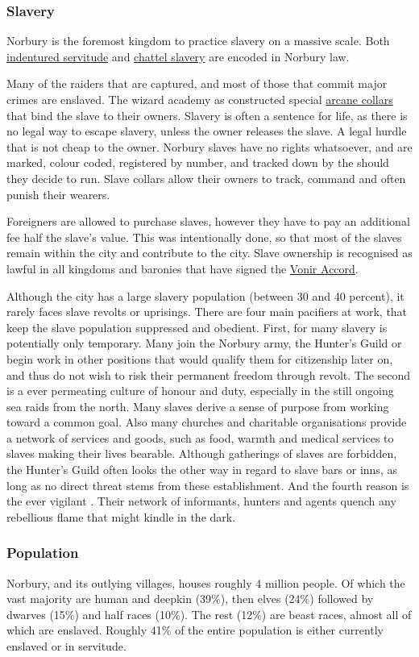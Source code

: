 \subsubsection{Slavery}
\label{sec:Slavery in Norbury}

Norbury is the foremost kingdom to practice slavery on a massive scale. Both
\hyperref[sec:Indentured Servitude]{indentured servitude} and
\hyperref[sec:Unregulated Slavery]{chattel slavery} are encoded in Norbury
law.

Many of the raiders that are captured, and most of those that commit major
crimes are enslaved. The wizard academy as constructed special
\hyperref[sec:Slave Band]{arcane collars} that bind the slave to their
owners. Slavery is often a sentence for life, as there is no legal way to
escape slavery, unless the owner releases the slave. A legal hurdle that is
not cheap to the owner. Norbury slaves have no rights whatsoever, and are
marked, colour coded, registered by number, and tracked down by the
 should they decide to run. Slave collars allow
their owners to track, command and often punish their wearers.

Foreigners are allowed to purchase slaves, however they have to pay an
additional fee half the slave's value. This was intentionally done, so that
most of the slaves remain within the city and contribute to the city. Slave
ownership is recognised as lawful in all kingdoms and baronies that have
signed the \hyperref[sec:Vonir Accord]{Vonir Accord}.

Although the city has a large slavery population (between 30 and 40 percent),
it rarely faces slave revolts or uprisings. There are four main pacifiers at
work, that keep the slave population suppressed and obedient. First, for many
slavery is potentially only temporary. Many join the Norbury army, the
Hunter's Guild or begin work in other positions that would qualify them for
citizenship later on, and thus do not wish to risk their permanent freedom
through revolt. The second is a ever permeating culture of honour and duty,
especially in the still ongoing sea raids from the north. Many slaves derive a
sense of purpose from working toward a common goal. Also many churches and
charitable organisations provide a network of services and goods, such as
food, warmth and medical services to slaves making their lives bearable.
Although gatherings of slaves are forbidden, the Hunter's Guild often looks
the other way in regard to slave bars or inns, as long as no direct threat
stems from these establishment. And the fourth reason is the ever vigilant
. Their network of informants, hunters and agents
quench any rebellious flame that might kindle in the dark.

\subsubsection{Population}

Norbury, and its outlying villages, houses roughly 4 million people. Of which
the vast majority are human and deepkin (39\%), then elves (24\%) followed by
dwarves (15\%) and half races (10\%). The rest (12\%) are beast races, almost
all of which are enslaved. Roughly 41\% of the entire population is either
currently enslaved or in servitude.
